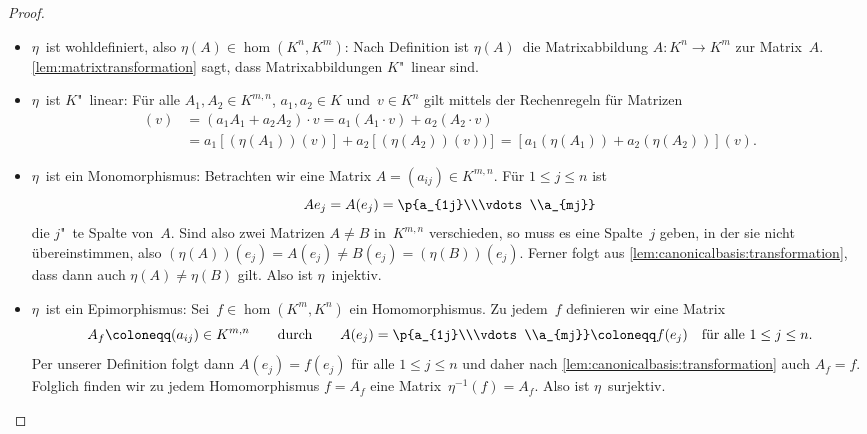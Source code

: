 \documentclass[a4paper]{article}
\begin{document}
\begin{proof}
    \begin{itemize}
        \item $\eta$~ist wohldefiniert, also $\eta(A) \in \hom(K^n,K^m)$: Nach Definition ist $\eta(A)$~die Matrixabbildung $A\colon K^n \to K^m$ zur Matrix~$A$. \cref{lem:matrixtransformation} sagt, dass Matrixabbildungen $K$"~linear sind.
        \item $\eta$~ist $K$"~linear: Für alle $A_1,A_2 \in K^{m,n}$, $a_1,a_2 \in K$ und~$v \in K^n$ gilt mittels der Rechenregeln für Matrizen
              \begin{align*}
                  [\eta(a_1A_1+a_2A_2)](v) & = (a_1A_1+a_2A_2) \cdot v = a_1(A_1\cdot v) + a_2(A_2\cdot v)                        \\
                                           & = a_1[(\eta(A_1))(v)] + a_2[(\eta(A_2))(v))] = [a_1(\eta(A_1)) + a_2(\eta(A_2))](v).
              \end{align*}
        \item $\eta$~ist ein Monomorphismus: Betrachten wir eine Matrix $A = (a_{ij}) \in K^{m,n}$. Für $1 \leq j \leq n$ ist
              \begin{equation*}
                  Ae_j = A(e_j) = \p{a_{1j}\\\vdots\\a_{mj}}
              \end{equation*}
              die $j$"~te Spalte von~$A$. Sind also zwei Matrizen $A \neq B$ in~$K^{m,n}$ verschieden, so muss es eine Spalte~$j$ geben, in der sie nicht übereinstimmen, also $(\eta(A))(e_j) = A(e_j) \neq B(e_j) = (\eta(B))(e_j)$. Ferner folgt aus \cref{lem:canonicalbasis:transformation}, dass dann auch $\eta(A) \neq \eta(B)$ gilt. Also ist $\eta$~injektiv.
        \item $\eta$~ist ein Epimorphismus: Sei~$f \in \hom(K^m,K^n)$ ein Homomorphismus. Zu jedem~$f$ definieren wir eine Matrix
              \begin{equation*}
                  A_f \coloneqq (a_{ij}) \in K^{m,n} \qquad\text{durch}\qquad A(e_j) = \p{a_{1j}\\\vdots\\a_{mj}} \coloneqq f(e_j) \quad\text{für alle } 1 \leq j \leq n.
              \end{equation*}
              Per unserer Definition folgt dann $A(e_j) = f(e_j)$ für alle $1 \leq j \leq n$ und daher nach \cref{lem:canonicalbasis:transformation} auch $A_f = f$. Folglich finden wir zu jedem Homomorphismus $f = A_f$ eine Matrix~$\eta^{-1}(f) = A_f$. Also ist $\eta$~surjektiv.
    \end{itemize}
\end{proof}
\end{document}

